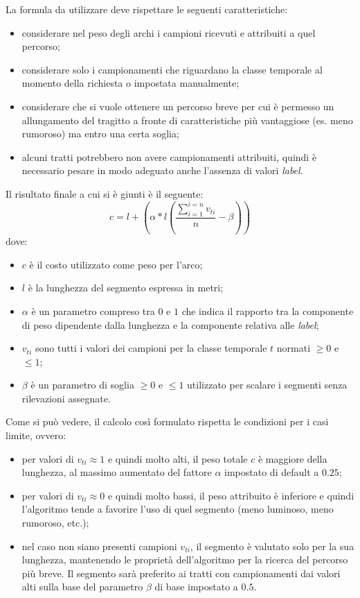 La formula da utilizzare deve rispettare le seguenti caratteristiche:
\begin{itemize}
\item considerare nel peso degli archi i campioni ricevuti e attribuiti a quel percorso;
\item considerare solo i campionamenti che riguardano la classe temporale al momento della richiesta o impostata manualmente;
\item considerare che si vuole ottenere un percorso breve per cui è permesso un allungamento del tragitto a fronte di caratteristiche più vantaggiose (es. meno rumoroso) ma entro una certa soglia;
\item alcuni tratti potrebbero non avere campionamenti attribuiti, quindi è necessario pesare in modo adeguato anche l'assenza di valori \emph{label}. 
\end{itemize}
Il risultato finale a cui si è giunti è il seguente:
$$ c=l+(\alpha * l (\frac{\sum\limits_{i=1}^{i=n}v_{ti}}{n}-\beta)) $$
dove:
\begin{itemize}
\item $c$ è il costo utilizzato come peso per l'arco;
\item $l$ è la lunghezza del segmento espressa in metri;
\item $\alpha$ è un parametro compreso tra $0$ e $1$ che indica il rapporto tra la componente di peso dipendente dalla lunghezza e la componente relativa alle \emph{label};
\item $v_{ti}$ sono tutti i valori dei campioni per la classe temporale $t$ normati $\geq0$ e $\leq1$;
\item $\beta$ è un parametro di soglia $\geq0$ e $\leq1$ utilizzato per scalare i segmenti senza rilevazioni assegnate.
\end{itemize}

Come si può vedere, il calcolo così formulato rispetta le condizioni per i casi limite, ovvero:
\begin{itemize}
\item per valori di $v_{ti} \approx 1$ e quindi molto alti, il peso totale $c$ è maggiore della lunghezza, al massimo aumentato del fattore $\alpha$ impostato di default a $0.25$;
\item per valori di $v_{ti} \approx 0$ e quindi molto bassi, il peso attribuito è inferiore e quindi l'algoritmo tende a favorire l'uso di quel segmento (meno luminoso, meno rumoroso, etc.);
\item nel caso non siano presenti campioni $v_{ti}$, il segmento è valutato solo per la sua lunghezza, mantenendo le proprietà dell'algoritmo per la ricerca del percorso più breve. Il segmento sarà preferito ai tratti con campionamenti dai valori alti sulla base del parametro $\beta$ di base impostato a $0.5$.
\end{itemize}

